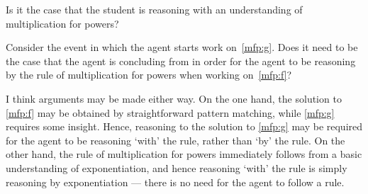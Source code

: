 \begin{note}
  Is it the case that the student is reasoning with an understanding of multiplication for powers?

  Consider the event in which the agent starts work on~\ref{mfp:g}.
  Does it need to be the case that the agent is concluding  from  in order for the agent to be reasoning by the rule of multiplication for powers when working on~\ref{mfp:f}?

  I think arguments may be made either way.
  On the one hand, the solution to \ref{mfp:f} may be obtained by straightforward pattern matching, while \ref{mfp:g} requires some insight.
  Hence, reasoning to the solution to \ref{mfp:g} may be required for the agent to be reasoning `with' the rule, rather than `by' the rule.
  On the other hand, the rule of multiplication for powers immediately follows from a basic understanding of exponentiation, and hence reasoning `with' the rule is simply reasoning by exponentiation --- there is no need for the agent to follow a rule.
\end{note}

